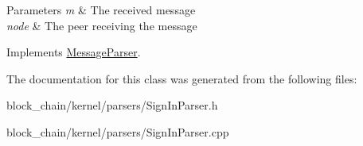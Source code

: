 \begin{DoxyParams}{Parameters}
{\em m} & The received message \\
\hline
{\em node} & The peer receiving the message \\
\hline
\end{DoxyParams}


Implements \mbox{\hyperlink{classMessageParser_a946f3b936dc01a75d6165329b159ecfe}{Message\+Parser}}.



The documentation for this class was generated from the following files\+:\begin{DoxyCompactItemize}
\item 
block\+\_\+chain/kernel/parsers/Sign\+In\+Parser.\+h\item 
block\+\_\+chain/kernel/parsers/Sign\+In\+Parser.\+cpp\end{DoxyCompactItemize}
